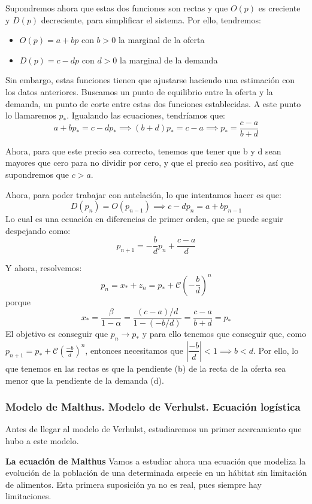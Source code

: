 \documentclass[11pt, a4paper]{article}
\newif\IfInSansMode
\numberwithin{equation}{section}
\theoremstyle{theorem-style}
\theoremstyle{definition-style}
\theoremstyle{remark-style}
\theoremstyle{example-style}
\begin{document}
Supondremos ahora que estas dos funciones son rectas y que $O(p)$ es creciente y $D(p)$ decreciente, para simplificar el sistema. Por ello, tendremos:
\begin{itemize}
\item $O(p) = a+bp $ con $b>0$ la marginal de la oferta
\item $D(p) = c -dp $ con $d> 0$ la marginal de la demanda
	
\end{itemize}
Sin embargo, estas funciones tienen que ajustarse haciendo una estimación con los datos anteriores. Buscamos un punto de equilibrio entre la oferta y la demanda, un punto de corte entre estas dos funciones establecidas. A este punto lo llamaremos $p_*$. Igualando las ecuaciones, tendríamos que:
\[
 a+bp_*=c-dp_*\implies(b+d)p_*= c-a \implies p_* = \frac{c-a}{b+d}
\]

Ahora, para que este precio sea correcto, tenemos que tener que b y d sean mayores que cero para no dividir por cero, y que el precio sea positivo, así que supondremos que $c> a$.

Ahora, para poder trabajar con antelación, lo que intentamos hacer es que:
\[
D(p_n) = O(p_{n-1}) \implies c-dp_n = a+bp_{n-1}
\]
Lo cual es una ecuación en diferencias de primer orden, que se puede seguir despejando como:
\[
p_{n+1} = -\dfrac{b}{d}p_n+ \dfrac{c-a}{d}
\]

Y ahora, resolvemos:
\[
p_n = x_* + z_n = p_* + \mathcal{C}\left(-\frac{b}{d}\right)^n
\] porque 
\[
x_* = \frac{\beta}{1-\alpha} = \frac{(c-a)/d}{1-(-b/d)}= \frac{c-a}{b+d} = p_*
\]
El objetivo es conseguir que $p_n \to p_*$ y para ello tenemos que conseguir que, como $p_{n+1} =p_* + \mathcal{C}(\frac{-b}{d})^n$, entonces necesitamos que $\left|\dfrac{-b}{d}\right| < 1 \implies b < d$.
Por ello, lo que tenemos en las rectas es que la pendiente (b) de la recta de la oferta sea menor que la pendiente de la demanda (d).

\subsubsection{Modelo de Malthus. Modelo de Verhulst. Ecuación logística}

Antes de llegar al modelo de Verhulst, estudiaremos un primer acercamiento que hubo a este modelo.

\textbf{La ecuación de Malthus}
Vamos a estudiar ahora una ecuación que modeliza la evolución de la población de una determinada especie en un hábitat sin limitación de alimentos. Esta primera suposición ya no es real, pues siempre hay limitaciones.
\end{document}
